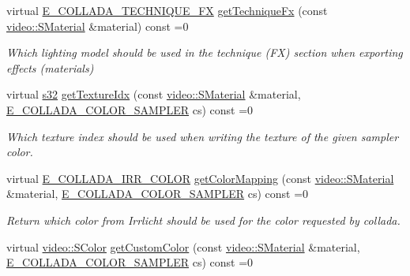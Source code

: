 \begin{DoxyCompactItemize}
virtual \hyperlink{namespaceirr_1_1scene_a9ec31e84e05295892488296b0741e2b1}{E\+\_\+\+C\+O\+L\+L\+A\+D\+A\+\_\+\+T\+E\+C\+H\+N\+I\+Q\+U\+E\+\_\+\+FX} \hyperlink{classirr_1_1scene_1_1IColladaMeshWriterProperties_abc0fb19092b53bdf48be8cc97a2af63b}{get\+Technique\+Fx} (const \hyperlink{classirr_1_1video_1_1SMaterial}{video\+::\+S\+Material} \&material) const =0
\begin{DoxyCompactList}\small\item\em Which lighting model should be used in the technique (FX) section when exporting effects (materials) \end{DoxyCompactList}\item 
virtual \hyperlink{namespaceirr_ac66849b7a6ed16e30ebede579f9b47c6}{s32} \hyperlink{classirr_1_1scene_1_1IColladaMeshWriterProperties_a171287213537036be889a36ae4896c0e}{get\+Texture\+Idx} (const \hyperlink{classirr_1_1video_1_1SMaterial}{video\+::\+S\+Material} \&material, \hyperlink{namespaceirr_1_1scene_a6204218341c6b449d879cd8367b2f8d8}{E\+\_\+\+C\+O\+L\+L\+A\+D\+A\+\_\+\+C\+O\+L\+O\+R\+\_\+\+S\+A\+M\+P\+L\+ER} cs) const =0
\begin{DoxyCompactList}\small\item\em Which texture index should be used when writing the texture of the given sampler color. \end{DoxyCompactList}\item 
virtual \hyperlink{namespaceirr_1_1scene_a61cba210038d6d843b81d9282f1cac7e}{E\+\_\+\+C\+O\+L\+L\+A\+D\+A\+\_\+\+I\+R\+R\+\_\+\+C\+O\+L\+OR} \hyperlink{classirr_1_1scene_1_1IColladaMeshWriterProperties_ab347c50cc9b291625d051a919d8772ab}{get\+Color\+Mapping} (const \hyperlink{classirr_1_1video_1_1SMaterial}{video\+::\+S\+Material} \&material, \hyperlink{namespaceirr_1_1scene_a6204218341c6b449d879cd8367b2f8d8}{E\+\_\+\+C\+O\+L\+L\+A\+D\+A\+\_\+\+C\+O\+L\+O\+R\+\_\+\+S\+A\+M\+P\+L\+ER} cs) const =0
\begin{DoxyCompactList}\small\item\em Return which color from Irrlicht should be used for the color requested by collada. \end{DoxyCompactList}\item 
virtual \hyperlink{classirr_1_1video_1_1SColor}{video\+::\+S\+Color} \hyperlink{classirr_1_1scene_1_1IColladaMeshWriterProperties_a8028af2323dab63df4bdfeb292ec48cd}{get\+Custom\+Color} (const \hyperlink{classirr_1_1video_1_1SMaterial}{video\+::\+S\+Material} \&material, \hyperlink{namespaceirr_1_1scene_a6204218341c6b449d879cd8367b2f8d8}{E\+\_\+\+C\+O\+L\+L\+A\+D\+A\+\_\+\+C\+O\+L\+O\+R\+\_\+\+S\+A\+M\+P\+L\+ER} cs) const =0

\end{DoxyCompactItemize}
